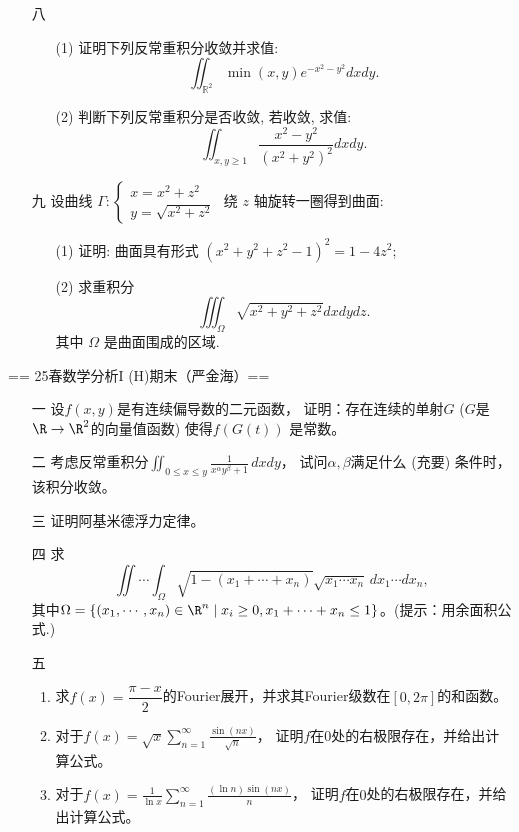 \begin{enumerate}
\item[八]
\begin{enumerate}
\item[(1)] 证明下列反常重积分收敛并求值:
    \[
        \iint_{\mathbb{R}^{2}}\min(x, y)e^{-x^{2} - y^{2}}d x d y.
    \]
\item[(2)] 判断下列反常重积分是否收敛, 若收敛, 求值:
    \[
        \iint_{x, y \geqslant 1}\dfrac{x^{2} - y^{2}}{(x^{2} + y^{2})^{2}}d x d y.
    \]
\end{enumerate}
\item[九] 设曲线 $\Gamma: \begin{cases}x = x^{2} + z^{2} \\ y = \sqrt{x^{2} + z^{2}}\end{cases}$
绕 $z$ 轴旋转一圈得到曲面:
\begin{enumerate}
    \item[(1)] 证明: 曲面具有形式 $(x^{2} + y^{2} + z^{2} - 1)^{2} = 1 - 4z^{2}$;
    \item[(2)] 求重积分
        \[
            \displaystyle\iiint_{\Omega}\sqrt{x^{2} + y^{2} + z^{2}}d x d y d z.
        \]
    其中 $\Omega$ 是曲面围成的区域.
\end{enumerate}
\end{enumerate}


== 25春数学分析I (H)期末（严金海）==
\begin{enumerate}
\item[一] 设$f(x,y)$是有连续偏导数的二元函数，
证明：存在连续的单射$G$ ($G$是$\R\to\R^2$的向量值函数) 使得$f(G(t))$ 是常数。

\item[二] 考虑反常重积分$\displaystyle\iint_{0 \le x \le y}\frac{1}{x^\alpha y^\beta+1}\,dxdy$，
试问$\alpha,\beta$满足什么 (充要) 条件时，该积分收敛。

\item[三] 证明阿基米德浮力定律。

\item[四] 求
\[\iint\!\cdots\!\int_{\Omega}\sqrt{1-(x_1+\cdots+x_n)}\sqrt{x_1 \cdots x_n}\,dx_1 \cdots dx_n,\]
其中$\Omega=\{(x_1,\cdots,x_n)\in\R^n \mid x_i\ge0,x_1+\cdots+x_n\le1\}$。(提示：用余面积公式.)

\item[五]\begin{enumerate}[label=(\arabic*)]
    \item 求$f(x)=\dfrac{\pi-x}{2}$的Fourier展开，并求其Fourier级数在$[0,2\pi]$的和函数。
    \item 对于$\displaystyle f(x)=\sqrt{x}\sum_{n=1}^{\infty}\frac{\sin(nx)}{\sqrt{n}}$，
    证明$f$在$0$处的右极限存在，并给出计算公式。
    \item 对于$\displaystyle f(x)=\frac{1}{\ln x}\sum_{n=1}^{\infty}\frac{(\ln n)\sin(nx)}{n}$，
    证明$f$在$0$处的右极限存在，并给出计算公式。
\end{enumerate}
\end{enumerate}


